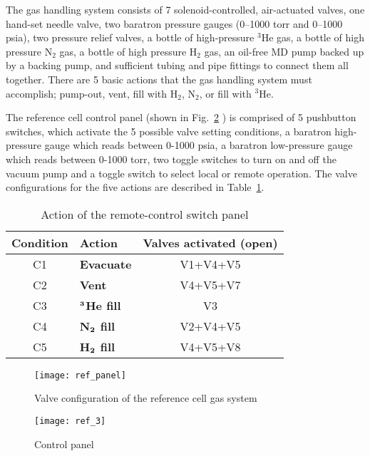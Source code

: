 {The gas handling system consists of 7 solenoid-controlled,
air-actuated valves, one hand-set needle valve, two baratron pressure
gauges (0--1000 torr and 0--1000 psia), two pressure relief valves, a
bottle of high-pressure $^3$He gas, a bottle of high pressure N$_2$
gas, a bottle of high pressure H$_2$ gas, an oil-free MD pump
backed up by a backing pump, and sufficient tubing and pipe fittings to
connect them all together.  There are 5 basic actions that the gas
handling system must accomplish; pump-out, vent, fill with H$_2$, N$_2$, or 
fill with $^3$He. 

The reference cell control panel (shown in Fig.~\ref{fig:refcell3} )
is comprised of 5 pushbutton switches, which activate the 5 possible
valve setting conditions, a baratron high-pressure gauge which reads
between 0-1000 psia, a baratron low-pressure gauge which reads between
0-1000 torr, two toggle switches to turn on and off the vacuum pump
and a toggle switch to select local or remote operation.  The valve
configurations for the five actions are described in
Table~\ref{tab:refcell}.

\begin{table}
\begin{center}
\begin{tabular}{|c|l|c|}
\hline\hline
Condition & Action & Valves activated (open) \rule[-2.5mm]{0mm}{7mm}\\
\hline
C1 & {\bf Evacuate} & V1+V4+V5 \\
C2 & {\bf Vent} & V4+V5+V7 \\
C3 & {\bf $\bf ^3$He fill} & V3 \\
C4 & {\bf N$\bf _2$ fill } & V2+V4+V5 \\
C5 & {\bf H$\bf _2$ fill } & V4+V5+V8 \\
\hline\hline
\end{tabular}
\caption{Action of the remote-control switch panel}
\label{tab:refcell}
\end{center}
\end{table}
\begin{figure}
\begin{center}
\centerline{ \texttt{[image: ref\_panel]}}
\caption{Valve configuration of the reference cell gas system}
\label{fig:refcell2}
\end{center}
\end{figure}

\begin{figure}
\begin{center}
\centerline{\texttt{[image: ref\_3]}}
\caption{Control panel}
\label{fig:refcell3}
\end{center}
\end{figure}


}
